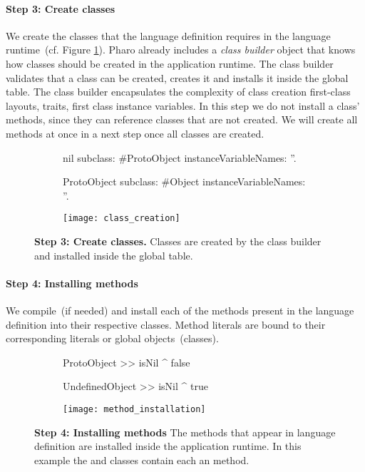\paragraph{\textbf{Step 3: Create classes}}
We create the classes that the language definition requires in the language runtime~(cf. Figure \ref{fig:class_creation}). Pharo already includes a \emph{class builder} object that knows how classes should be created in the application runtime. The class builder validates that a class can be created, creates it and installs it inside the global table. The class builder encapsulates the complexity of class creation \eg first-class layouts, traits, first class instance variables. In this step we do not install a class' methods, since they can reference classes that are not created. We will create all methods at once in a next step once all classes are created.

\begin{figure}[ht]
\begin{subfigure}{.4\linewidth}
\begin{code}
nil subclass: #ProtoObject
    instanceVariableNames: ''.

ProtoObject
    subclass: #Object
    instanceVariableNames: ''.
\end{code}
\end{subfigure}
\begin{subfigure}{.6\linewidth}
\texttt{[image: class\_creation]}
\end{subfigure}
\caption{\textbf{Step 3: Create classes.} Classes are created by the class builder and installed inside the global table. \label{fig:class_creation}}
\end{figure}

\paragraph{\textbf{Step 4: Installing methods}}

We compile~(if needed) and install each of the methods present in the language definition into their respective classes. Method literals are bound to their corresponding literals or global objects~(\eg classes).

\begin{figure}[ht]
\begin{subfigure}{.4\linewidth}
\begin{code}
ProtoObject >> isNil
   ^ false

UndefinedObject >> isNil
   ^ true
\end{code}
\end{subfigure}
\begin{subfigure}{.6\linewidth}
\texttt{[image: method\_installation]}
\end{subfigure}
\caption{\textbf{Step 4: Installing methods} The methods that appear in language definition are installed inside the application runtime. In this example the  and  classes contain each an  method.\label{fig:method_installation}}
\end{figure}


